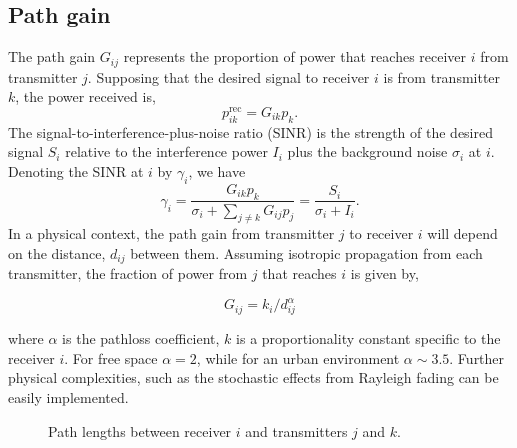 \documentclass[twocolumn,secnumarabic,amssymb, nobibnotes, aps, prl,superscriptaddress]{revtex4-1}
\begin{document}
\subsection{Path gain}
The path gain $G_{ij}$ represents the proportion of power that reaches receiver $i$ from transmitter $j$. Supposing that the desired signal to receiver $i$ is from transmitter $k$, the power received is,
\begin{equation}
p_{ik}^{\text{rec}} = G_{ik}p_k.
\end{equation}
The signal-to-interference-plus-noise ratio (SINR) is the strength of the desired signal $S_i$ relative to the interference power $I_i$ plus the background noise $\sigma_i$ at $i$. Denoting the SINR at $i$ by $\gamma_i$, we have
\begin{equation}
\gamma_i = \frac{G_{ik}p_k}{\sigma_i+\sum_{j\neq k}G_{ij}p_j}
=\frac{S_i}{\sigma_i+I_i}.
\end{equation}
In a physical context, the path gain from transmitter $j$ to receiver $i$ will depend on the distance, $d_{ij}$ between them.  Assuming isotropic propagation from each transmitter, the fraction of power from $j$ that reaches $i$ is given by,

\begin{equation}
G_{ij} = k_i/d_{ij}^\alpha
\end{equation}

where $\alpha$ is the pathloss coefficient, $k$ is a proportionality constant specific to the receiver $i$.  For free space $\alpha = 2$, while for an urban environment $\alpha \sim 3.5$.  Further physical complexities, such as the stochastic effects from Rayleigh fading can be easily implemented.

\begin{figure}[H]
\centering
{}
\caption{Path lengths between receiver $i$ and transmitters $j$ and $k$.}\label{fig:spatial_diagram}
\end{figure}
\end{document}
